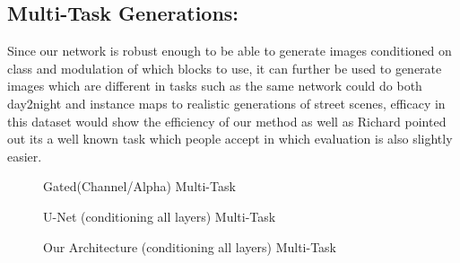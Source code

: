 \subsection{Multi-Task Generations: }
Since our network is robust enough to be able to generate images conditioned on class and modulation of which blocks to use, it can further be used to generate images which are different in tasks such as the same network could do both day2night and instance maps to realistic generations of street scenes, efficacy in this dataset would show the efficiency of our method as well as Richard pointed out its a well known task which people accept in which evaluation is also slightly easier.


\begin{figure}%
    \centering
    \caption{Gated(Channel/Alpha) Multi-Task}
    \label{fig:channel_gated_multi-task}
    \vspace{-3mm}
\end{figure}

\begin{figure}%
    \centering
    \caption{U-Net (conditioning all layers) Multi-Task}
    \label{fig:channel_gated_multi-task}
    \vspace{-3mm}
\end{figure}

\begin{figure}%
    \centering
    \caption{Our Architecture (conditioning all layers) Multi-Task}
    \label{fig:channel_gated_multi-task}
    \vspace{-3mm}
\end{figure}

